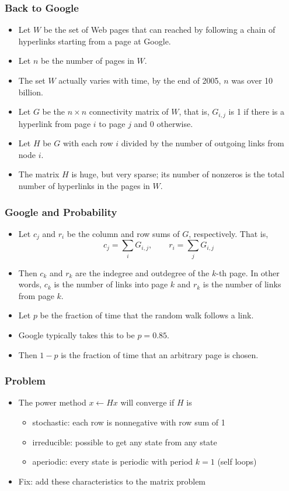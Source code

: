 \documentclass[10pt]{beamer}
\begin{document}
\begin{frame}
\frametitle{Back to Google}
\begin{itemize}
\item Let $W$ be the set of Web pages that can reached by
following a chain of hyperlinks starting from a page at Google.
\item Let $n$ be the number of pages in $W$.
\item The set $W$ actually varies with time, by the end of 2005,
$n$ was over 10 billion.
\item Let $G$ be the $n \times n$ connectivity matrix of $W$, that
is, $G_{i,j}$ is 1 if there is a hyperlink from page $i$ to page
$j$ and 0 otherwise.
\item Let $H$ be $G$ with each row $i$ divided by the number of outgoing links
from node $i$.
\item The matrix $H$ is huge, but very sparse; its number of
nonzeros is the total number of hyperlinks in the pages in $W$.
\end{itemize}
\end{frame}

\begin{frame}
\frametitle{Google and Probability}
\begin{itemize}
\item Let $c_j$ and $r_i$ be the column and row sums of $G$,
respectively. That is,
$$c_j = \sum_i G_{i,j}, \qquad r_i = \sum_j G_{i,j}$$
\item Then $c_k$ and $r_k$ are the indegree and outdegree of the
$k$-th page.  In other words, $c_k$ is the number of links into page $k$ 
and $r_k$ is the number of links from page $k$.
\item Let $p$ be the fraction of time that the random walk follows
a link.
\item Google typically takes this to be $p = 0.85$.
\item Then $1-p$ is the fraction of time that an arbitrary page is
chosen.
\end{itemize}
\end{frame}
\begin{frame}
\frametitle{Problem}
\begin{itemize}
  \item The power method $x \leftarrow H x$ will converge if $H$ is
\begin{itemize}
\item stochastic: each row is nonnegative with row sum of 1
\item irreducible: possible to get any state from any state
\item aperiodic: every state is periodic with period $k=1$ (self loops)
\end{itemize}
  \item Fix: add these characteristics to the matrix problem
\end{itemize}
\end{frame}
\end{document}

